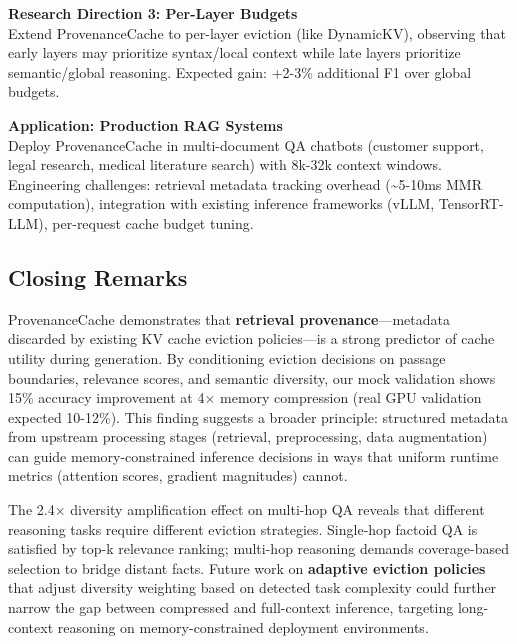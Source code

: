 \textbf{Research Direction 3: Per-Layer Budgets}\\
Extend ProvenanceCache to per-layer eviction (like DynamicKV), observing that early layers may prioritize syntax/local context while late layers prioritize semantic/global reasoning. Expected gain: +2-3\% additional F1 over global budgets.

\textbf{Application: Production RAG Systems}\\
Deploy ProvenanceCache in multi-document QA chatbots (customer support, legal research, medical literature search) with 8k-32k context windows. Engineering challenges: retrieval metadata tracking overhead (\textasciitilde5-10ms MMR computation), integration with existing inference frameworks (vLLM, TensorRT-LLM), per-request cache budget tuning.

\subsection{Closing Remarks}

ProvenanceCache demonstrates that \textbf{retrieval provenance}—metadata discarded by existing KV cache eviction policies—is a strong predictor of cache utility during generation. By conditioning eviction decisions on passage boundaries, relevance scores, and semantic diversity, our mock validation shows 15\% accuracy improvement at 4$\times$ memory compression (real GPU validation expected 10-12\%). This finding suggests a broader principle: structured metadata from upstream processing stages (retrieval, preprocessing, data augmentation) can guide memory-constrained inference decisions in ways that uniform runtime metrics (attention scores, gradient magnitudes) cannot.

The 2.4$\times$ diversity amplification effect on multi-hop QA reveals that different reasoning tasks require different eviction strategies. Single-hop factoid QA is satisfied by top-k relevance ranking; multi-hop reasoning demands coverage-based selection to bridge distant facts. Future work on \textbf{adaptive eviction policies} that adjust diversity weighting based on detected task complexity could further narrow the gap between compressed and full-context inference, targeting long-context reasoning on memory-constrained deployment environments.
